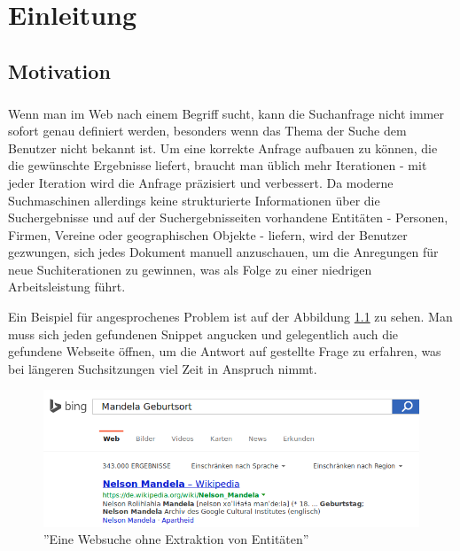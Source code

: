 \chapter{Einleitung}

\section{Motivation}
\label{sec:Motivation}
\paragraph{}
Wenn man im Web nach einem Begriff sucht, kann die Suchanfrage nicht immer sofort genau definiert werden, besonders wenn das Thema der Suche dem Benutzer nicht bekannt ist. Um eine korrekte Anfrage aufbauen zu können, die die gewünschte Ergebnisse liefert, braucht man üblich mehr Iterationen - mit jeder Iteration wird die Anfrage präzisiert und verbessert. Da moderne Suchmaschinen allerdings keine strukturierte Informationen über die Suchergebnisse und auf der Suchergebnisseiten vorhandene Entitäten - Personen, Firmen, Vereine oder geographischen Objekte - liefern, wird der Benutzer gezwungen, sich jedes Dokument manuell anzuschauen, um die Anregungen für neue Suchiterationen zu gewinnen, was als Folge zu einer niedrigen Arbeitsleistung führt.

Ein Beispiel für angesprochenes Problem ist auf der Abbildung \ref{fig:bing-issue} zu sehen. Man muss sich jeden gefundenen Snippet angucken und gelegentlich auch die gefundene Webseite öffnen, um die Antwort auf gestellte Frage zu erfahren, was bei längeren Suchsitzungen viel Zeit in Anspruch nimmt.

\begin{figure}
\centering
\includegraphics[width=1\textwidth]{Bilder/bing-search1.png}
\caption{''Eine Websuche ohne Extraktion von Entitäten''}
\label{fig:bing-issue}
\end{figure}

